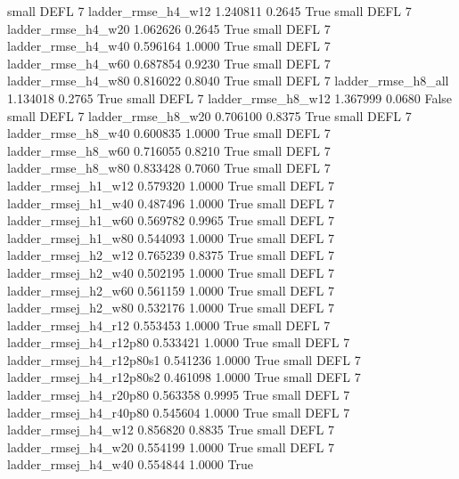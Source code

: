      small     DEFL                 7       ladder_rmse_h4_w12   1.240811      0.2645    True
     small     DEFL                 7       ladder_rmse_h4_w20   1.062626      0.2645    True
     small     DEFL                 7       ladder_rmse_h4_w40   0.596164      1.0000    True
     small     DEFL                 7       ladder_rmse_h4_w60   0.687854      0.9230    True
     small     DEFL                 7       ladder_rmse_h4_w80   0.816022      0.8040    True
     small     DEFL                 7       ladder_rmse_h8_all   1.134018      0.2765    True
     small     DEFL                 7       ladder_rmse_h8_w12   1.367999      0.0680   False
     small     DEFL                 7       ladder_rmse_h8_w20   0.706100      0.8375    True
     small     DEFL                 7       ladder_rmse_h8_w40   0.600835      1.0000    True
     small     DEFL                 7       ladder_rmse_h8_w60   0.716055      0.8210    True
     small     DEFL                 7       ladder_rmse_h8_w80   0.833428      0.7060    True
     small     DEFL                 7      ladder_rmsej_h1_w12   0.579320      1.0000    True
     small     DEFL                 7      ladder_rmsej_h1_w40   0.487496      1.0000    True
     small     DEFL                 7      ladder_rmsej_h1_w60   0.569782      0.9965    True
     small     DEFL                 7      ladder_rmsej_h1_w80   0.544093      1.0000    True
     small     DEFL                 7      ladder_rmsej_h2_w12   0.765239      0.8375    True
     small     DEFL                 7      ladder_rmsej_h2_w40   0.502195      1.0000    True
     small     DEFL                 7      ladder_rmsej_h2_w60   0.561159      1.0000    True
     small     DEFL                 7      ladder_rmsej_h2_w80   0.532176      1.0000    True
     small     DEFL                 7      ladder_rmsej_h4_r12   0.553453      1.0000    True
     small     DEFL                 7   ladder_rmsej_h4_r12p80   0.533421      1.0000    True
     small     DEFL                 7 ladder_rmsej_h4_r12p80s1   0.541236      1.0000    True
     small     DEFL                 7 ladder_rmsej_h4_r12p80s2   0.461098      1.0000    True
     small     DEFL                 7   ladder_rmsej_h4_r20p80   0.563358      0.9995    True
     small     DEFL                 7   ladder_rmsej_h4_r40p80   0.545604      1.0000    True
     small     DEFL                 7      ladder_rmsej_h4_w12   0.856820      0.8835    True
     small     DEFL                 7      ladder_rmsej_h4_w20   0.554199      1.0000    True
     small     DEFL                 7      ladder_rmsej_h4_w40   0.554844      1.0000    True
